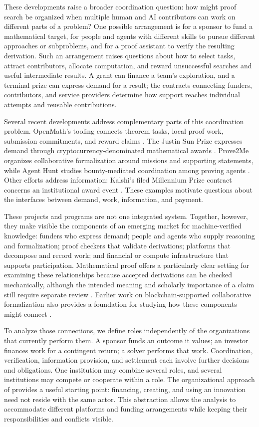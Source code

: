 \documentclass[11pt,a4paper]{article}
\begin{document}
These developments raise a broader coordination question: how might proof search be organized when multiple human and AI contributors can work on different parts of a problem? One possible arrangement is for a sponsor to fund a mathematical target, for people and agents with different skills to pursue different approaches or subproblems, and for a proof assistant to verify the resulting derivation. Such an arrangement raises questions about how to select tasks, attract contributors, allocate computation, and reward unsuccessful searches and useful intermediate results. A grant can finance a team's exploration, and a terminal prize can express demand for a result; the contracts connecting funders, contributors, and service providers determine how support reaches individual attempts and reusable contributions.

Several recent developments address complementary parts of this coordination problem. OpenMath's tooling connects theorem tasks, local proof work, submission commitments, and reward claims \citep{openmath}. The Justin Sun Prize expresses demand through cryptocurrency-denominated mathematical awards \citep{sun}. Prove2Me organizes collaborative formalization around missions and supporting statements, while Agent Hunt studies bounty-mediated coordination among proving agents \citep{prove2me,hunt}. Other efforts address information: Kalshi's filed Millennium Prize contract concerns an institutional award event \citep{kalshi}. These examples motivate questions about the interfaces between demand, work, information, and payment.

These projects and programs are not one integrated system. Together, however, they make visible the components of an emerging market for machine-verified knowledge: funders who express demand; people and agents who supply reasoning and formalization; proof checkers that validate derivations; platforms that decompose and record work; and financial or compute infrastructure that supports participation. Mathematical proof offers a particularly clear setting for examining these relationships because accepted derivations can be checked mechanically, although the intended meaning and scholarly importance of a claim still require separate review \citep{lean}. Earlier work on blockchain-supported collaborative formalization also provides a foundation for studying how these components might connect \citep{lim}.

To analyze those connections, we define roles independently of the organizations that currently perform them. A sponsor funds an outcome it values; an investor finances work for a contingent return; a solver performs that work. Coordination, verification, information provision, and settlement each involve further decisions and obligations. One institution may combine several roles, and several institutions may compete or cooperate within a role. The organizational approach of \citet{aghiontirole} provides a useful starting point: financing, creating, and using an innovation need not reside with the same actor. This abstraction allows the analysis to accommodate different platforms and funding arrangements while keeping their responsibilities and conflicts visible.
\end{document}
